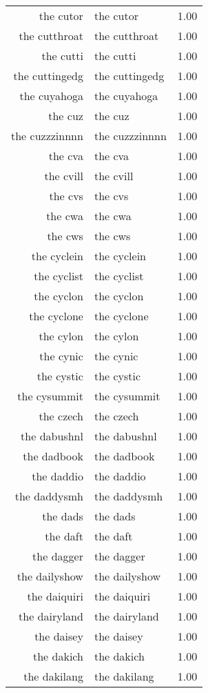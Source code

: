 \begin{table}[ht]
\begin{tabular}{rlr}
  the cutor & the cutor & 1.00 \\ 
  the cutthroat & the cutthroat & 1.00 \\ 
  the cutti & the cutti & 1.00 \\ 
  the cuttingedg & the cuttingedg & 1.00 \\ 
  the cuyahoga & the cuyahoga & 1.00 \\ 
  the cuz & the cuz & 1.00 \\ 
  the cuzzzinnnn & the cuzzzinnnn & 1.00 \\ 
  the cva & the cva & 1.00 \\ 
  the cvill & the cvill & 1.00 \\ 
  the cvs & the cvs & 1.00 \\ 
  the cwa & the cwa & 1.00 \\ 
  the cws & the cws & 1.00 \\ 
  the cyclein & the cyclein & 1.00 \\ 
  the cyclist & the cyclist & 1.00 \\ 
  the cyclon & the cyclon & 1.00 \\ 
  the cyclone & the cyclone & 1.00 \\ 
  the cylon & the cylon & 1.00 \\ 
  the cynic & the cynic & 1.00 \\ 
  the cystic & the cystic & 1.00 \\ 
  the cysummit & the cysummit & 1.00 \\ 
  the czech & the czech & 1.00 \\ 
  the dabushnl & the dabushnl & 1.00 \\ 
  the dadbook & the dadbook & 1.00 \\ 
  the daddio & the daddio & 1.00 \\ 
  the daddysmh & the daddysmh & 1.00 \\ 
  the dads & the dads & 1.00 \\ 
  the daft & the daft & 1.00 \\ 
  the dagger & the dagger & 1.00 \\ 
  the dailyshow & the dailyshow & 1.00 \\ 
  the daiquiri & the daiquiri & 1.00 \\ 
  the dairyland & the dairyland & 1.00 \\ 
  the daisey & the daisey & 1.00 \\ 
  the dakich & the dakich & 1.00 \\ 
  the dakilang & the dakilang & 1.00 \\ 

\end{tabular}
\end{table}
